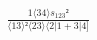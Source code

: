 \documentclass[varwidth, border=5pt]{standalone}
\begin{document}
\begin{my}
$\begin{gathered}
\scriptscriptstyle\frac{1⟨34⟩s_{123}²}{⟨13⟩²⟨23⟩⟨2|1+3|4]}
\end{gathered}$
\end{my}
\end{document}

